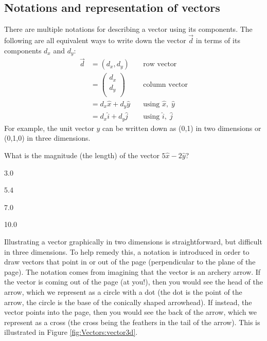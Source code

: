 \subsection{Notations and representation of vectors}
There are multiple notations for describing a vector using its components. The following are all equivalent ways to write down the vector $\vec d$ in terms of its components $d_x$ and $d_y$:
\begin{align*}
\vec d &= (d_x,d_y)\quad&\text{row vector}\\
       &=\begin{pmatrix}
           d_x \\
           d_y \\
         \end{pmatrix}\quad&\text{column vector}\\
         &= d_x\hat x +d_y \hat y\quad&\text{using }\hat x,\;\hat y\\
         &=d_x\hat i +d_y \hat j \quad&\text{using }\hat i,\;\hat j
\end{align*}
For example, the unit vector $\hat y$ can be written down as (0,1) in two dimensions or (0,1,0) in three dimensions. 

\begin{checkpoint}
\begin{MCquestion}{What is the magnitude (the length) of the vector $5\hat x-2\hat y$?}
\item 3.0
\item 5.4 \correct
\item 7.0
\item 10.0
\end{MCquestion}
\end{checkpoint}

Illustrating a vector graphically in two dimensions is straightforward, but difficult in three dimensions. To help remedy this, a notation is introduced in order to draw vectors that point in or out of the page (perpendicular to the plane of the page). The notation comes from imagining that the vector is an archery arrow. If the vector is coming out of the page (at you!), then you would see the head of the arrow, which we represent as a circle with a dot (the dot is the point of the arrow, the circle is the base of the conically shaped arrowhead). If instead, the vector points into the page, then you would see the back of the arrow, which we represent as a cross (the cross being the feathers in the tail of the arrow). This is illustrated in Figure \ref{fig:Vectors:vector3d}.

